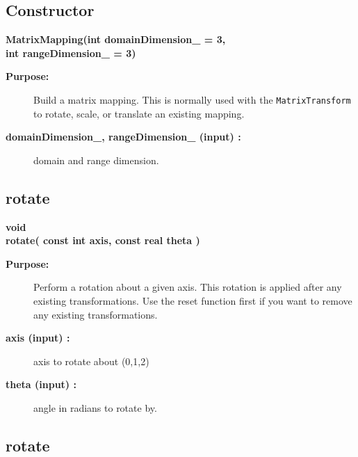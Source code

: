 \subsection{Constructor}
 
\newlength{\MatrixMappingIncludeArgIndent}
\begin{flushleft} \textbf{%
\settowidth{\MatrixMappingIncludeArgIndent}{MatrixMapping(}%
MatrixMapping(int domainDimension\_  = 3, \\ 
\hspace{\MatrixMappingIncludeArgIndent}int rangeDimension\_  = 3)
}\end{flushleft}
\begin{description}
\item[{\bf Purpose:}]  Build a matrix mapping. This is normally used with the {\tt MatrixTransform}
   to rotate, scale, or translate an existing mapping.
\item[{\bf domainDimension\_, rangeDimension\_ (input) :}]  domain and range dimension.

\end{description}
\subsection{rotate}
 
\begin{flushleft} \textbf{%
void  \\ 
\settowidth{\MatrixMappingIncludeArgIndent}{rotate(}%
rotate( const int axis, const real theta )
}\end{flushleft}
\begin{description}
\item[{\bf Purpose:}]  Perform a rotation about a given axis. This rotation is applied
   after any existing transformations. Use the reset function first if you
   want to remove any existing transformations.
\item[{\bf axis (input) :}]  axis to rotate about (0,1,2)
\item[{\bf theta (input) :}]  angle in radians to rotate by.
\end{description}
\subsection{rotate}
 
